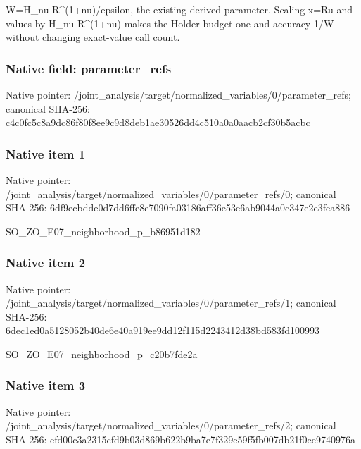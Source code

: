 \documentclass[10pt,a4paper]{article}
\begin{document}
\begingroup\raggedright\sloppy W=\allowbreak{}H\_\allowbreak{}nu R\textasciicircum{}(1+nu)/\allowbreak{}epsilon,\allowbreak{} the existing derived parameter. Scaling x=\allowbreak{}Ru and values by H\_\allowbreak{}nu R\textasciicircum{}(1+nu) makes the Holder budget one and accuracy 1/\allowbreak{}W without changing exact-value call count.\par\endgroup

\subsubsection{Native field: parameter\_\allowbreak{}refs}
Native pointer: /joint\_\allowbreak{}analysis/target/normalized\_\allowbreak{}variables/0/parameter\_\allowbreak{}refs; canonical SHA-256: c4c0fc5c8a9dc86f80f8ee9c9d8deb1ae30526dd4c510a0a0aacb2cf30b5acbc

\subsubsection{Native item 1}
Native pointer: /joint\_\allowbreak{}analysis/target/normalized\_\allowbreak{}variables/0/parameter\_\allowbreak{}refs/0; canonical SHA-256: 6df9ecbdde0d7dd6ffe8e7090fa03186aff36e53e6ab9044a0c347e2e3fea886

\begingroup\raggedright\sloppy SO\_\allowbreak{}ZO\_\allowbreak{}E07\_\allowbreak{}neighborhood\_\allowbreak{}p\_\allowbreak{}b86951d182\par\endgroup

\subsubsection{Native item 2}
Native pointer: /joint\_\allowbreak{}analysis/target/normalized\_\allowbreak{}variables/0/parameter\_\allowbreak{}refs/1; canonical SHA-256: 6dec1ed0a5128052b40de6e40a919ee9dd12f115d2243412d38bd583fd100993

\begingroup\raggedright\sloppy SO\_\allowbreak{}ZO\_\allowbreak{}E07\_\allowbreak{}neighborhood\_\allowbreak{}p\_\allowbreak{}c20b7fde2a\par\endgroup

\subsubsection{Native item 3}
Native pointer: /joint\_\allowbreak{}analysis/target/normalized\_\allowbreak{}variables/0/parameter\_\allowbreak{}refs/2; canonical SHA-256: efd00c3a2315cfd9b03d869b622b9ba7e7f329e59f5fb007db21f0ee9740976a
\end{document}
